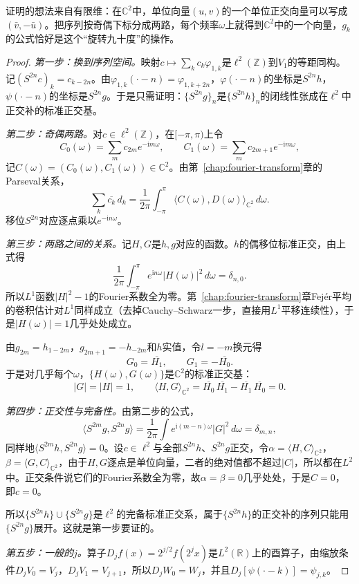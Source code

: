 证明的想法来自有限维：在$\mathbb C^2$中，单位向量$(u,v)$的一个单位正交向量可以写成$(\bar v,-\bar u)$。把序列按奇偶下标分成两路，每个频率$\omega$上就得到$\mathbb C^2$中的一个向量，$g_k$的公式恰好是这个“旋转九十度”的操作。

\begin{proof}
\emph{第一步：换到序列空间。}映射$c\mapsto\sum_kc_k\varphi_{1,k}$是$\ell^2(\mathbb Z)$到$V_1$的等距同构。记$(S^{2n}c)_k=c_{k-2n}$。由$\varphi_{1,k}(\cdot-n)=\varphi_{1,k+2n}$，$\varphi(\cdot-n)$的坐标是$S^{2n}h$，$\psi(\cdot-n)$的坐标是$S^{2n}g$。于是只需证明：$\{S^{2n}g\}_{n}$是$\{S^{2n}h\}_{n}$的闭线性张成在$\ell^2$中正交补的标准正交基。

\emph{第二步：奇偶两路。}对$c\in\ell^2(\mathbb Z)$，在$[-\pi,\pi)$上令
\[
 C_0(\omega)=\sum_mc_{2m}e^{-\mathrm im\omega},\qquad
 C_1(\omega)=\sum_mc_{2m+1}e^{-\mathrm im\omega},
\]
记$C(\omega)=(C_0(\omega),C_1(\omega))\in\mathbb C^2$。由第~\ref{chap:fourier-transform}章的Parseval关系，
\[
 \sum_k\overline{c_k}\,d_k=\frac1{2\pi}\int_{-\pi}^{\pi}\langle C(\omega),D(\omega)\rangle_{\mathbb C^2}\,d\omega.
\]
移位$S^{2n}$对应逐点乘以$e^{-\mathrm in\omega}$。

\emph{第三步：两路之间的关系。}记$H,G$是$h,g$对应的函数。$h$的偶移位标准正交，由上式得
\[
 \frac1{2\pi}\int_{-\pi}^{\pi}e^{\mathrm in\omega}\lvert H(\omega)\rvert^2\,d\omega=\delta_{n,0}.
\]
所以$L^1$函数$\lvert H\rvert^2-1$的Fourier系数全为零。第~\ref{chap:fourier-transform}章Fejér平均的卷积估计对$L^1$同样成立（去掉Cauchy--Schwarz一步，直接用$L^1$平移连续性），于是$\lvert H(\omega)\rvert=1$几乎处处成立。

由$g_{2m}=h_{1-2m}$，$g_{2m+1}=-h_{-2m}$和$h$实值，令$l=-m$换元得
\[
 G_0=\overline{H_1},\qquad G_1=-\overline{H_0}.
\]
于是对几乎每个$\omega$，$\{H(\omega),G(\omega)\}$是$\mathbb C^2$的标准正交基：
\[
 \lvert G\rvert=\lvert H\rvert=1,\qquad
 \langle H,G\rangle_{\mathbb C^2}=\overline{H_0}\,\overline{H_1}-\overline{H_1}\,\overline{H_0}=0.
\]

\emph{第四步：正交性与完备性。}由第二步的公式，
\[
 \langle S^{2m}g,S^{2n}g\rangle=\frac1{2\pi}\int e^{\mathrm i(m-n)\omega}\lvert G\rvert^2\,d\omega=\delta_{m,n},
\]
同样地$\langle S^{2m}h,S^{2n}g\rangle=0$。设$c\in\ell^2$与全部$S^{2n}h$、$S^{2n}g$正交，令$\alpha=\langle H,C\rangle_{\mathbb C^2}$，$\beta=\langle G,C\rangle_{\mathbb C^2}$，由于$H,G$逐点是单位向量，二者的绝对值都不超过$\lvert C\rvert$，所以都在$L^2$中。正交条件说它们的Fourier系数全为零，故$\alpha=\beta=0$几乎处处，于是$C=0$，即$c=0$。

所以$\{S^{2n}h\}\cup\{S^{2n}g\}$是$\ell^2$的完备标准正交系，属于$\{S^{2n}h\}$的正交补的序列只能用$\{S^{2n}g\}$展开。这就是第一步要证的。

\emph{第五步：一般的$j$。}算子$D_jf(x)=2^{j/2}f(2^jx)$是$L^2(\mathbb R)$上的酉算子，由缩放条件$D_jV_0=V_j$，$D_jV_1=V_{j+1}$，所以$D_jW_0=W_j$，并且$D_j[\psi(\cdot-k)]=\psi_{j,k}$。
\end{proof}

